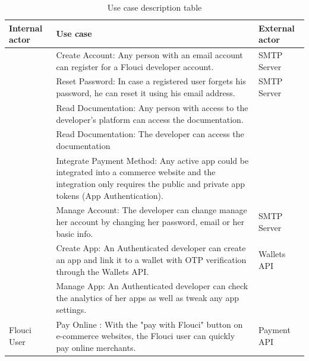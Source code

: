 \begin{spacing}{1.2}
\begin{table}[!h]
	\centering
	\caption{Use case description table}
	\footnotesize
	\begin{tabularx}
	{\linewidth}{|>{\centering{}\vspace*{\fill}}X|>{\centering{}\vspace*{\fill}}X|>{\vspace*{\fill}}X<{\centering{}}|}	
			\hline 
			 \bfseries Internal actor & \bfseries Use case &\bfseries External actor \\
			\hline 
			\multirow{3}{*}{Anonymous Developer}			&	Create Account: Any person with an email account can register for a Flouci developer account. 	&	SMTP Server			\\
			\cline{2-3}
				& Reset Password: In case a registered user forgets his password, he can reset it using his email address. 		&		SMTP Server		\\
				\cline{2-3}
					&	Read Documentation: Any person with access to the developer's platform can access the documentation.	&				\\
			\hline 
			\multirow{5}{*}{Registered Developer}					&	Read Documentation: The developer can access the documentation 	&				\\
			\cline{2-3}
			&	Integrate Payment Method: Any active app could be integrated into a commerce website and the integration only requires the public and private app tokens (App Authentication).	&				\\
			\cline{2-3}
					&	Manage Account:    The developer can change manage her account by changing her password, email or her basic info.	&		SMTP Server	\\
					\cline{2-3}
					&	Create App: An Authenticated developer can create an app and link it to a wallet with OTP verification through the Wallets API.	&			Wallets API	\\
					\cline{2-3}
					&	Manage App:	 An Authenticated  developer can check the analytics of her apps as well as tweak any app settings. &				\\		
					
			\hline 
			Flouci User	& Pay Online : With the "pay with Flouci" button on e-commerce websites, the Flouci user can quickly pay online merchants.  	&	Payment API	\\
			
			\hline
	\end{tabularx}
	\label{tab:usecasediagram}
\end{table}



\end{spacing}
